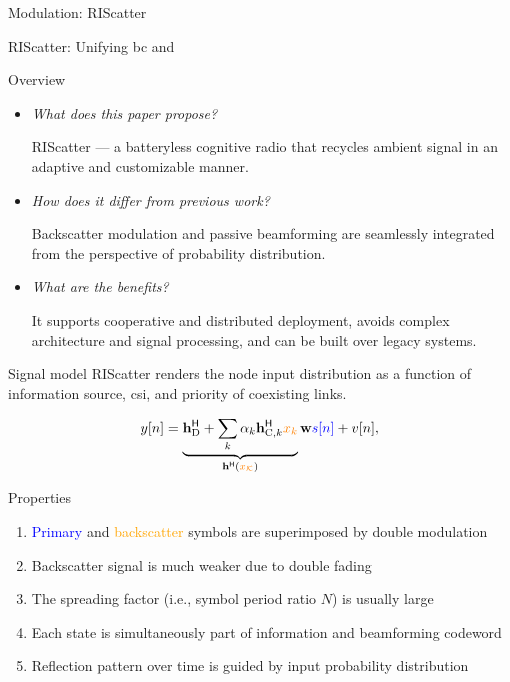 \documentclass[presentation,xcolor={table},9pt]{beamer}
\begin{document}
\begin{section}{Modulation: RIScatter}
	\begin{frame}{RIScatter: Unifying \gls{bc} and }
		\begin{block}{Overview}
			\begin{itemize}\setlength\itemsep{20pt}
				\item \textit{What does this paper propose?}

				RIScatter --- a batteryless cognitive radio that recycles ambient signal in an adaptive and customizable manner.
				\item \textit{How does it differ from previous work?}

				Backscatter modulation and passive beamforming are seamlessly integrated from the perspective of probability distribution.
				\item \textit{What are the benefits?}

				It supports cooperative and distributed deployment, avoids complex architecture and signal processing, and can be built over legacy systems.
			\end{itemize}
		\end{block}
	\end{frame}

	\begin{frame}{Signal model}
		RIScatter renders the node input distribution as a function of information source, \gls{csi}, and priority of coexisting links.
		\begin{figure}[H]
			\centering
			\def\svgwidth{0.6\columnwidth}
			
			\label{fg:riscatter_network}
		\end{figure}
		\begin{equation*}
			y[n] = \underbrace{\mathbf{h}_{\text{D}}^\mathsf{H} + \sum_{k} \alpha_k \mathbf{h}_{\text{C},k}^\mathsf{H} \textcolor{orange}{x_k}}_{\mathbf{h}^\mathsf{H}(\textcolor{orange}{x_{\mathcal{K}}})} \mathbf{w} \textcolor{blue}{s[n]} + v[n],
		\end{equation*}
		\vspace{-0.25cm}
		\begin{block}{Properties}
			\begin{enumerate}
				\item \textcolor{blue}{Primary} and \textcolor{orange}{backscatter} symbols are superimposed by {double modulation}
				\item Backscatter signal is much weaker due to {double fading}
				\item The spreading factor (i.e., symbol period ratio $N$) is usually large
				\item Each {state} is simultaneously part of information and beamforming {codeword}
				\item Reflection pattern over time is guided by input probability distribution
			\end{enumerate}
		\end{block}
	\end{frame}


\end{section}
\end{document}
